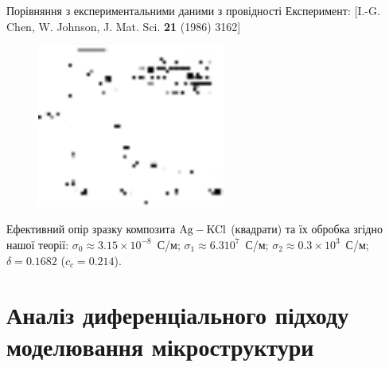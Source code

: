 \documentclass[10pt]{beamer}
\begin{document}
\begin{frame}{Порівняння з експериментальними даними з провідності}
\scriptsize{Експеримент: [I.-G. Chen, W. Johnson, J. Mat. Sci. {\bf 21} (1986) 3162]}
\footnotesize

\begin{figure}[tb]
    \centering
    \includegraphics[width=0.55\textwidth]{images/grannan-sigma-fin.eps}
\end{figure}
Ефективний опір зразку композита $\rm Ag-KCl$ (квадрати) та їх обробка згідно нашої теорії:
$\sigma_0 \approx 3.15 \times 10^{-8}$~С/м; $\sigma_1 \approx 6.3 10^7$~С/м; $\sigma_2 \approx 0.3 \times 10^3$~С/м; $\delta = 0.1682$ ($c_c = 0.214$).

\end{frame}
\section{Аналіз диференціального підходу моделювання мікроструктури}%
\end{document}
